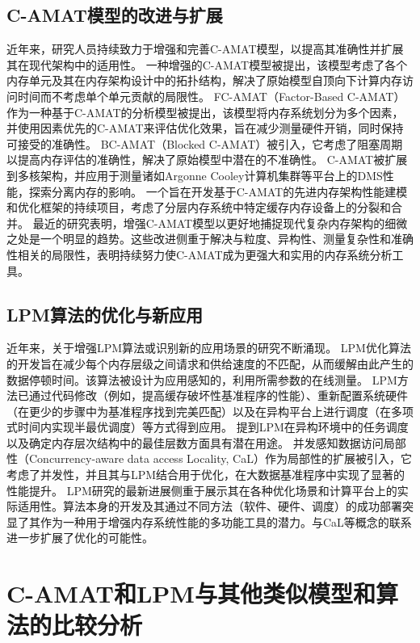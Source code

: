 \documentclass[UTF8]{ctexart}
\begin{document}
\subsection{C-AMAT模型的改进与扩展}
近年来，研究人员持续致力于增强和完善C-AMAT模型，以提高其准确性并扩展其在现代架构中的适用性\cite{illustrationCAMATPureMiss}。
一种增强的C-AMAT模型被提出，该模型考虑了各个内存单元及其在内存架构设计中的拓扑结构，解决了原始模型自顶向下计算内存访问时间而不考虑单个单元贡献的局限性\cite{feng2022proceedings}。
FC-AMAT（Factor-Based C-AMAT）作为一种基于C-AMAT的分析模型被提出，该模型将内存系统划分为多个因素，并使用因素优先的C-AMAT来评估优化效果，旨在减少测量硬件开销，同时保持可接受的准确性\cite{feng2022proceedings}。
BC-AMAT（Blocked C-AMAT）被引入，它考虑了阻塞周期以提高内存评估的准确性，解决了原始模型中潜在的不准确性\cite{feng2022proceedings}。
C-AMAT被扩展到多核架构，并应用于测量诸如Argonne Cooley计算机集群等平台上的DMS性能，探索分离内存的影响\cite{sun2020performance}。
一个旨在开发基于C-AMAT的先进内存架构性能建模和优化框架的持续项目，考虑了分层内存系统中特定缓存内存设备上的分裂和合并\cite{iitGnosisOptmem}。
最近的研究表明，增强C-AMAT模型以更好地捕捉现代复杂内存架构的细微之处是一个明显的趋势。这些改进侧重于解决与粒度、异构性、测量复杂性和准确性相关的局限性，表明持续努力使C-AMAT成为更强大和实用的内存系统分析工具。

\subsection{LPM算法的优化与新应用}
近年来，关于增强LPM算法或识别新的应用场景的研究不断涌现\cite{feng2022proceedings}。
LPM优化算法的开发旨在减少每个内存层级之间请求和供给速度的不匹配，从而缓解由此产生的数据停顿时间。该算法被设计为应用感知的，利用所需参数的在线测量\cite{liu2024lpm}。
LPM方法已通过代码修改（例如，提高缓存破坏性基准程序的性能）、重新配置系统硬件（在更少的步骤中为基准程序找到完美匹配）以及在异构平台上进行调度（在多项式时间内实现半最优调度）等方式得到应用\cite{liu2024lpm}。
\cite{sunMemoryPdf}提到LPM在异构环境中的任务调度以及确定内存层次结构中的最佳层数方面具有潜在用途。
并发感知数据访问局部性（Concurrency-aware data access Locality, CaL）作为局部性的扩展被引入，它考虑了并发性，并且其与LPM结合用于优化，在大数据基准程序中实现了显著的性能提升\cite{liu2024cal}。
LPM研究的最新进展侧重于展示其在各种优化场景和计算平台上的实际适用性。算法本身的开发及其通过不同方法（软件、硬件、调度）的成功部署突显了其作为一种用于增强内存系统性能的多功能工具的潜力。与CaL等概念的联系进一步扩展了优化的可能性。

\section{C-AMAT和LPM与其他类似模型和算法的比较分析}
\end{document}
